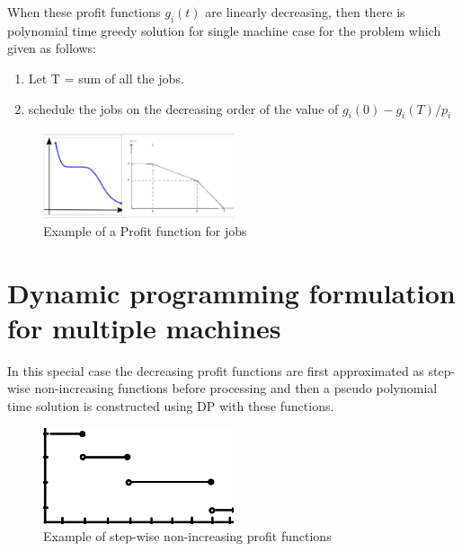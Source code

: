 \documentclass[11pt, a4paper, notitlepage, oneside]{article}
\begin{document}
{When these profit functions $ g_i(t) $ are linearly decreasing, then there is polynomial time greedy solution for single machine case for the problem which given as follows:

\begin{enumerate}
\item Let T = sum of all the jobs.
\item schedule the jobs on the decreasing order of the value of 
$ g_i(0) - g_i(T)/p_i $ 
\end{enumerate}


\begin{figure}
\caption{Example of a Profit function for jobs}
\centering
\includegraphics[width=0.5\textwidth]{dec}
\end{figure}




















\section{Dynamic programming formulation for multiple machines}

In this special case the decreasing profit functions are first approximated as step-wise non-increasing functions before processing and then a pseudo polynomial time solution is constructed using DP with these functions.


\begin{figure}[!h]
\caption{Example of step-wise non-increasing profit functions}
\centering
\includegraphics[width=0.5\textwidth]{step}
\end{figure}

}
\end{document}

